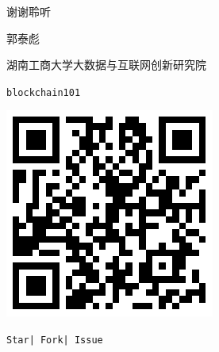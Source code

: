 \documentclass[11pt]{beamer}
\begin{document}
\begin{frame}
	\begin{minipage}[t]{0.5\linewidth}
		\begin{center}
			\begin{figure}
				\vspace{10pt}

				{\Huge 谢谢聆听}

				\vspace{30pt}
				郭泰彪

				\vspace{10pt}
				{\tiny 湖南工商大学大数据与互联网创新研究院}
			\end{figure}
			\begin{figure}

			\end{figure}
		\end{center}
	\end{minipage}%
	\begin{minipage}[t]{0.4\linewidth}
		\begin{figure}
			\centering
			\texttt{blockchain101}

			\includegraphics[width=0.6\linewidth]{figures/blockchain101qrcode}

			{\footnotesize \texttt{Star| Fork| Issue}}
		\end{figure}
	\end{minipage}%
\end{frame}
\end{document}
